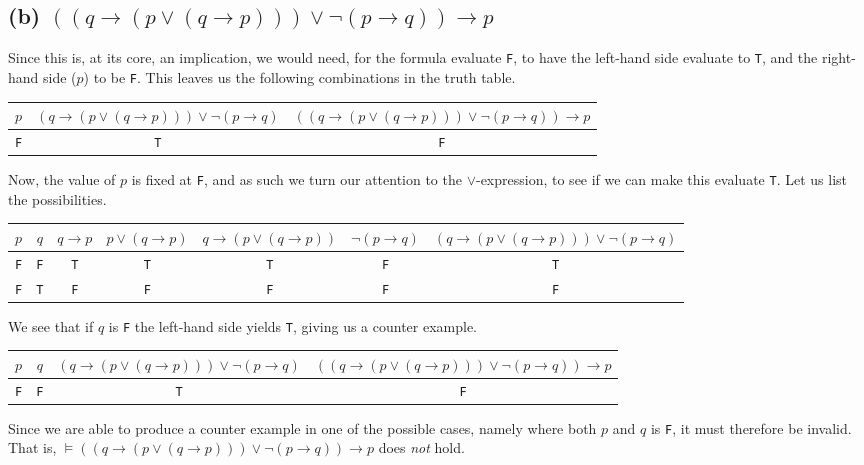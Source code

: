 \documentclass[11pt,a4paper]{article}
\let\imp\to
\begin{document}
\subsection*{(b) \mdseries $((q \imp (p \lor (q \imp p))) \lor \neg(p \imp q)) \imp p$}
Since this is, at its core, an implication, we would need, for the formula evaluate {\tt F}, to have the left-hand side evaluate to {\tt T}, and the right-hand side ($p$) to be {\tt F}. This leaves us the following combinations in the truth table.
\begin{center}
	\begin{tabular}{cc|c}
		$p$ & $(q \imp (p \lor (q \imp p))) \lor \neg(p \imp q)$ & $((q \imp (p \lor (q \imp p))) \lor \neg(p \imp q)) \imp p$ \\ \hline
		{\tt F} & {\tt T} & {\tt F} \\
	\end{tabular}
\end{center}
Now, the value of $p$ is fixed at {\tt F}, and as such we turn our attention to the $\lor$-expression, to see if we can make this evaluate {\tt T}. Let us list the possibilities.
\begin{center}
	\begin{tabular}{cccccc|c}
		$p$ & $q$ & $q \imp p$ & $p \lor (q \imp p)$ &
		$q \imp (p \lor (q \imp p))$ & $\neg (p \imp q)$ &
		$(q \imp (p \lor (q \imp p))) \lor \neg(p \imp q)$ \\ \hline
		{\tt F} & {\tt F} & {\tt T} & {\tt T} & {\tt T} & {\tt F} & {\tt T} \\
		{\tt F} & {\tt T} & {\tt F} & {\tt F} & {\tt F} & {\tt F} & {\tt F} \\
	\end{tabular}
\end{center}
We see that if $q$ is {\tt F} the left-hand side yields {\tt T}, giving us a counter example.
\begin{center}
	\begin{tabular}{ccc|c}
		$p$ & $q$ & $(q \imp (p \lor (q \imp p))) \lor \neg(p \imp q)$ &
		$((q \imp (p \lor (q \imp p))) \lor \neg(p \imp q)) \imp p$ \\ \hline
		{\tt F} & {\tt F} & {\tt T} & {\tt F} \\
	\end{tabular}
\end{center}
Since we are able to produce a counter example in one of the possible cases, namely where both $p$ and $q$ is {\tt F}, it must therefore be invalid. That is, $\models ((q \imp (p \lor (q \imp p))) \lor \neg(p \imp q)) \imp p$ does {\it not} hold.
\end{document}
